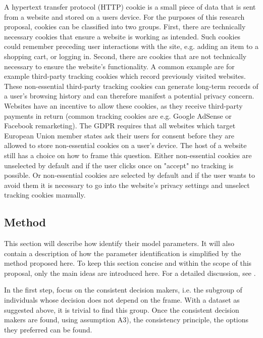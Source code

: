 A hypertext transfer protocol (HTTP) cookie is a small piece of data that is sent from
a website and stored on a users device. For the purposes of this research proposal, cookies can be classified into two groups. First, there are
technically necessary cookies that ensure a website is working as intended. Such cookies could remember preceding user
interactions with the site, e.g. adding an item to a shopping cart, or logging in. Second, there are cookies that are not technically
necessary to ensure the website's functionality. A common example are for example third-party tracking cookies which record previously visited websites.
These non-essential third-party tracking cookies can generate long-term records of a user's browsing history and can therefore manifest a potential privacy concern.
Websites have an incentive to allow these cookies, as they receive third-party payments in return (common tracking cookies are e.g. Google AdSense or Facebook remarketing).  
The GDPR requires that all websites which target European Union member states ask their users for consent
before they are allowed to store non-essential cookies on a user's device. The host of a website still
has a choice on how to frame this question. Either non-essential cookies are unselected by default and if the
user clicks once on "accept" no tracking is possible. Or non-essential cookies are selected by default and if the user wants
to avoid them it is necessary to go into the website's privacy settings and unselect tracking cookies manually.

\subsection{Method} \label{method}

This section will describe how \textcite{goldin2020} identify their model parameters. It will also contain a description
of how the parameter identification is simplified by the method proposed here.
To keep this section concise and within the scope of this proposal, only the main ideas are introduced here.
For a detailed discussion, see \textcite[p.2767]{goldin2020}.

In the first step, \textcite{goldin2020} focus on the consistent decision makers, i.e. the subgroup of individuals
whose decision does not depend on the frame. With a dataset as suggested above, it is trivial to find this group.
Once the consistent decision makers are found, using assumption A3), the consistency principle, the options they preferred can be found.

